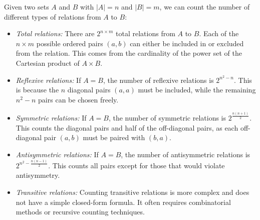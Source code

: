 Given two sets \(A\) and \(B\) with \(|A| = n\) and \(|B| = m\), we can count the number of different types of relations from \(A\) to \(B\):

\begin{itemize}

	\item \emph{Total relations:} There are \(2^{n \times m}\) total relations from \(A\) to \(B\). Each of the 
		  \(n \times m\) possible ordered pairs \((a, b)\) can either be included in or excluded from the relation. This comes from the cardinality of 
		  the power set of the Cartesian product of \(A \times B\).

	\item \emph{Reflexive relations:} If \(A = B\), the number of reflexive relations is \(2^{n^2 - n}\). This is because 
		  the \(n\) diagonal pairs \((a, a)\) must be included, while the remaining \(n^2 - n\) pairs can be chosen freely.

	\item \emph{Symmetric relations:} If \(A = B\), the number of symmetric relations is \(2^{\frac{n(n+1)}{2}}\). This counts 
		  the diagonal pairs and half of the off-diagonal pairs, as each off-diagonal pair \((a, b)\) must be paired with \((b, a)\).

	\item \emph{Antisymmetric relations:} If \(A = B\), the number of antisymmetric relations is \(2^{n^2 - \frac{n(n-1)}{2}}\). 
		  This counts all pairs except for those that would violate antisymmetry.

	\item \emph{Transitive relations:} Counting transitive relations is more complex and does not have a simple closed-form formula. 
		  It often requires combinatorial methods or recursive counting techniques. 

\end{itemize}

